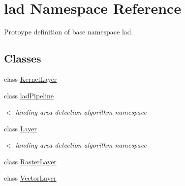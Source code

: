 \hypertarget{namespacelad}{}\section{lad Namespace Reference}
\label{namespacelad}


Protoype definition of base namespace lad.  


\subsection*{Classes}
\begin{DoxyCompactItemize}
\item 
class \hyperlink{classlad_1_1_kernel_layer}{Kernel\+Layer}
\item 
class \hyperlink{classlad_1_1lad_pipeline}{lad\+Pipeline}
\begin{DoxyCompactList}\small\item\em $<$ landing area detection algorithm namespace \end{DoxyCompactList}\item 
class \hyperlink{classlad_1_1_layer}{Layer}
\begin{DoxyCompactList}\small\item\em $<$ landing area detection algorithm namespace \end{DoxyCompactList}\item 
class \hyperlink{classlad_1_1_raster_layer}{Raster\+Layer}
\item 
class \hyperlink{classlad_1_1_vector_layer}{Vector\+Layer}
\end{DoxyCompactItemize}
